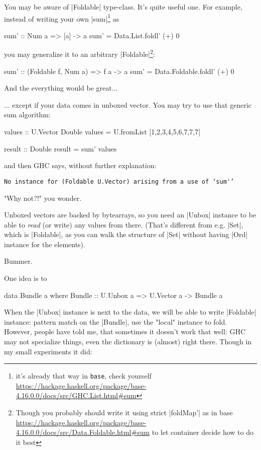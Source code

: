 You may be aware of |Foldable| type-class.
It's quite useful one. For example, instead of writing your own |sum|\footnote{it's already that way in \texttt{base}, check yourself \url{https://hackage.haskell.org/package/base-4.16.0.0/docs/src/GHC.List.html#sum}} as

\begin{code}
sum' :: Num a => [a] -> a
sum' = Data.List.foldl' (+) 0
\end{code}

you may generalize it to an arbitrary |Foldable|\footnote{Though you probably should write it using strict |foldMap'| as in base \url{https://hackage.haskell.org/package/base-4.16.0.0/docs/src/Data.Foldable.html#sum} to let container decide how to do it best}:

\begin{code}
sum' :: (Foldable f, Num a) => f a -> a
sum' = Data.Foldable.foldl' (+) 0
\end{code}

And the everything would be great...

... except if your data comes in unboxed vector.
You may try to use that generic sum algorithm:

\begin{code}
values :: U.Vector Double
values = U.fromList [1,2,3,4,5,6,7,7,7]

result :: Double
result = sum' values
\end{code}

and then GHC says, without further explanation:

\begin{verbatim}
No instance for (Foldable U.Vector) arising from a use of ‘sum'’
\end{verbatim}

"Why not?!" you wonder.

Unboxed vectors are backed by bytearrays, so you need an |Unbox| instance
to be able to \emph{read} (or write) any values from there.
(That's different from e.g. |Set|, which is |Foldable|, as you can walk the structure of
 |Set| without having |Ord| instance for the elements).

Bummer.

One idea is to

\begin{code}
data Bundle a where
    Bundle :: U.Unbox a => U.Vector a -> Bundle a
\end{code}

When the |Unbox| instance is next to the data, we will be able to write |Foldable| instance:
pattern match on the |Bundle|, use the "local" instance to fold.
However, people have told me, that sometimes it doesn't work that well:
GHC may not specialize things, even the dictionary is (almost) right there.
Though in my small experiments it did:

